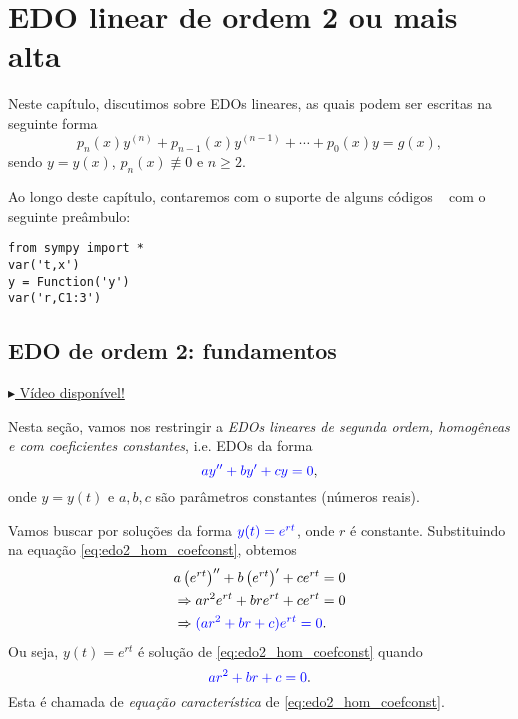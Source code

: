 
\chapter{EDO linear de ordem 2 ou mais alta}\label{cap_edolin}
\thispagestyle{fancy}

Neste capítulo, discutimos sobre EDOs lineares, as quais podem ser escritas na seguinte forma
\begin{equation}
  p_n(x)y^{(n)} + p_{n-1}(x)y^{(n-1)} + \cdots + p_0(x)y = g(x),
\end{equation}
sendo $y = y(x)$, $p_n(x)\not\equiv 0$ e $n\geq 2$.

\ifispython
\begin{obs}\label{obs:cap_edolin_python}
Ao longo deste capítulo, contaremos com o suporte de alguns códigos \python~ com o seguinte preâmbulo:
\begin{verbatim}
from sympy import *
var('t,x')
y = Function('y')
var('r,C1:3')
\end{verbatim}
\end{obs}
\fi


\section{EDO de ordem 2: fundamentos}\label{cap_edolin_sec_edo2I}

\begin{flushright}
  \href{https://archive.org/details/introducao-edo-ordem-2}{$\blacktriangleright$ Vídeo disponível!}
\end{flushright}

Nesta seção, vamos nos restringir a \emph{EDOs lineares de segunda ordem, homogêneas e com coeficientes constantes}, i.e. EDOs da forma
\begin{equation}\label{eq:edo2_hom_coefconst}
  {\color{blue}ay'' + by' + cy = 0},
\end{equation}
onde $y = y(t)$ e $a, b, c$ são parâmetros constantes (números reais).

Vamos buscar por soluções da forma ${\color{blue}y(t) = e^{rt}}$, onde $r$ é constante. Substituindo na equação \eqref{eq:edo2_hom_coefconst}, obtemos
\begin{align}
  & a\left(e^{rt}\right)'' + b\left(e^{rt}\right)' + ce^{rt} = 0 \\
  & \Rightarrow ar^2e^{rt} + bre^{rt} + ce^{rt} = 0 \\
  & \Rightarrow {\color{blue}(ar^2 + br + c)e^{rt} = 0}.
\end{align}
Ou seja, $y(t) = e^{rt}$ é solução de \eqref{eq:edo2_hom_coefconst} quando
\begin{equation}
  {\color{blue}ar^2 + br + c = 0}.
\end{equation}
Esta é chamada de \emph{equação característica} de \eqref{eq:edo2_hom_coefconst}.

